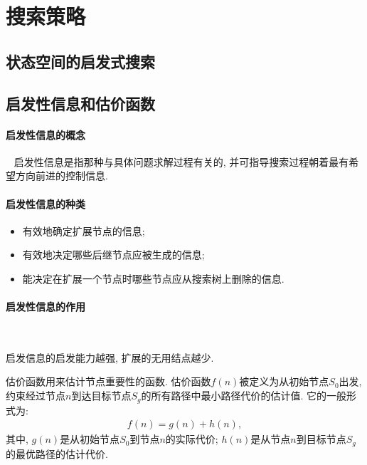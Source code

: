 \section{搜索策略}
\subsection{状态空间的启发式搜索}
\subsection{启发性信息和估价函数}
\paragraph{启发性信息的概念}~{}
启发性信息是指那种与具体问题求解过程有关的, 并可指导搜索过程朝着最有希望方向前进的控制信息.

\paragraph{启发性信息的种类}
\begin{itemize}
\item 有效地确定扩展节点的信息;
\item 有效地决定哪些后继节点应被生成的信息;
\item 能决定在扩展一个节点时哪些节点应从搜索树上删除的信息.
\end{itemize}
\paragraph{启发性信息的作用}~{}

启发信息的启发能力越强, 扩展的无用结点越少.

估价函数用来估计节点重要性的函数. 估价函数$f(n)$被定义为从初始节点$S_0$出发, 约束经过节点$n$到达目标节点$S_g$的所有路径中最小路径代价的估计值. 它的一般形式为:
\begin{align}
  f(n)=g(n)+h(n),
\end{align}
其中, $g(n)$是从初始节点$S_0$到节点$n$的实际代价; $h(n)$是从节点$n$到目标节点$S_g$的最优路径的估计代价.
